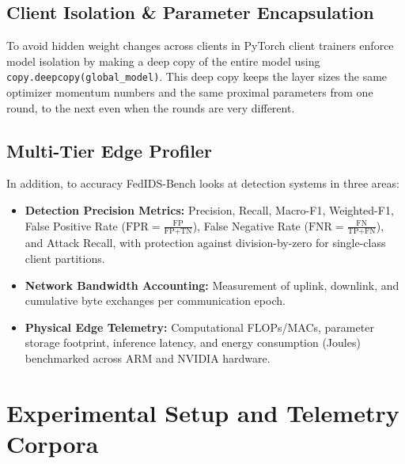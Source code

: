 \documentclass[runningheads]{llncs}
\begin{document}
\subsection{Client Isolation \& Parameter Encapsulation}
To avoid hidden weight changes across clients in PyTorch client trainers enforce model isolation by making a deep copy of the entire model using \texttt{copy.deepcopy(global\_model)}. This deep copy keeps the layer sizes the same optimizer momentum numbers and the same proximal parameters from one round, to the next even when the rounds are very different.

\subsection{Multi-Tier Edge Profiler}
In addition, to accuracy FedIDS-Bench looks at detection systems in three areas:
\begin{itemize}
    \item \textbf{Detection Precision Metrics:} Precision, Recall, Macro-F1, Weighted-F1, False Positive Rate ($\text{FPR} = \frac{\text{FP}}{\text{FP} + \text{TN}}$), False Negative Rate ($\text{FNR} = \frac{\text{FN}}{\text{TP} + \text{FN}}$), and Attack Recall, with protection against division-by-zero for single-class client partitions.
    \item \textbf{Network Bandwidth Accounting:} Measurement of uplink, downlink, and cumulative byte exchanges per communication epoch.
    \item \textbf{Physical Edge Telemetry:} Computational FLOPs/MACs, parameter storage footprint, inference latency, and energy consumption (Joules) benchmarked across ARM and NVIDIA hardware.
\end{itemize}

\section{Experimental Setup and Telemetry Corpora}
\label{sec:methodology}
\end{document}
